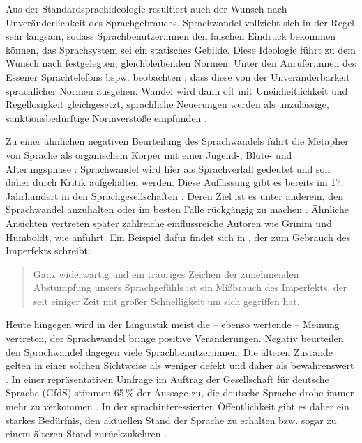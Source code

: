 Aus der Standardsprachideologie resultiert auch der Wunsch nach Unveränderlichkeit des Sprachgebrauchs.
Sprachwandel vollzieht sich in der Regel sehr langsam, sodass Sprachbenutzer:innen den falschen Eindruck bekommen können, das Sprachsystem sei ein statisches Gebilde.
Diese Ideologie führt zu dem Wunsch nach festgelegten, gleichbleibenden Normen.
Unter den Anrufer:innen des Essener Sprachtelefons bspw. beobachten \citet[125]{Bunting1996}, dass diese von der Unveränderbarkeit sprachlicher Normen ausgehen. 
Wandel wird dann oft mit Uneinheitlichkeit und Regellosigkeit gleichgesetzt, sprachliche Neuerungen werden als unzulässige, {sanktions\-be\-dürf\-ti\-ge} Normverstöße empfunden \citep[s.][34]{Hennig2009}. 

Zu einer ähnlichen negativen Beurteilung des Sprachwandels führt die Metapher von Sprache als organischem Körper mit einer Jugend-, Blüte- und Alterungsphase \citep[s.][89--90]{Kilian2010}: Sprachwandel wird hier als Sprachverfall gedeutet und soll daher durch Kritik aufgehalten werden. 
Diese Auffassung gibt es bereits im 17. Jahrhundert in den Sprachgesellschaften \citep[s.][39]{Hundt.2000}. 
Deren Ziel ist es unter anderem, den Sprachwandel anzuhalten oder im besten Falle rückgängig zu machen \citep[s.][41]{Hundt.2000}.
Ähnliche Ansichten vertreten später zahlreiche einflussreiche Autoren wie Grimm und Humboldt, wie \citet[10--11]{Labov.2006} anführt.
Ein Beispiel dafür findet sich in \citet[]{Wustmann.1911}, der zum Gebrauch des Imperfekts schreibt: 
\begin{quote} Ganz widerwärtig und ein trauriges Zeichen der zunehmenden Abstumpfung unsers Sprachgefühls ist ein Mißbrauch des Imperfekts, der seit einiger Zeit mit großer Schnelligkeit um sich gegriffen hat. \citep[101]{Wustmann.1911}\end{quote}
Heute hingegen wird in der Linguistik meist die -- ebenso wertende -- Meinung vertreten, der Sprachwandel bringe positive Veränderungen. 
Negativ beurteilen den Sprachwandel dagegen viele Sprachbenutzer:innen: 
\glqq Die älteren Zustände gelten in einer solchen Sichtweise als weniger defekt und daher als bewahrenswert\grqq{} \citep[89]{Kilian2010}. 
In einer repräsentativen Umfrage im Auftrag der Gesellschaft für deutsche Sprache (GfdS) stimmen 65\,\% der Aussage zu, die deutsche Sprache drohe immer mehr zu verkommen \citep[s.][10]{Hoberg.2008}. 
In der sprachinteressierten Öffentlichkeit gibt es daher ein starkes Bedürfnis, den aktuellen Stand der Sprache zu erhalten bzw. sogar zu einem älteren Stand zurückzukehren \citep[s.][13--14]{Cameron1995}. 

